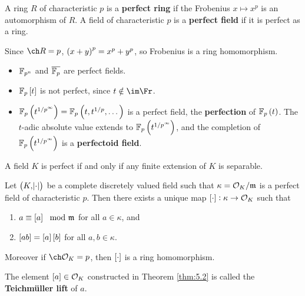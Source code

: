 \begin{definition}
A ring $ R $ of characteristic $ p $ is a \textbf{perfect ring} if the Frobenius $ x \mapsto x^p $ is an automorphism of $ R $. A field of characteristic $ p $ is a \textbf{perfect field} if it is perfect as a ring.
\end{definition}

\begin{remark*}
Since $ \ch R = p $, $ \br{x + y}^p = x^p + y^p $, so Frobenius is a ring homomorphism.
\end{remark*}

\begin{example*}
\hfill
\begin{itemize}
\item $ \mathbb{F}_{p^n} $ and $ \overline{\mathbb{F}_p} $ are perfect fields.
\item $ \FF_p\sbr{t} $ is not perfect, since $ t \notin \im \Fr $.
\item $ \FF_p\br{t^{1 / p^\infty}} = \FF_p\br{t, t^{1 / p}, \dots} $ is a perfect field, the \textbf{perfection} of $ \FF_p\br{t} $. The $ t $-adic absolute value extends to $ \FF_p\br{t^{1 / p^\infty}} $, and the completion of $ \FF_p\br{t^{1 / p^\infty}} $ is a \textbf{perfectoid field}.
\end{itemize}
\end{example*}

\begin{fact*}
A field $ K $ is perfect if and only if any finite extension of $ K $ is separable.
\end{fact*}

\pagebreak

\begin{theorem}
\label{thm:5.2}
Let $ \br{K, \abs{\cdot}} $ be a complete discretely valued field such that $ \kappa = \mathcal{O}_K / \mathfrak{m} $ is a perfect field of characteristic $ p $. Then there exists a unique map $ \sbr{\cdot} : \kappa \to \OOO_K $ such that
\begin{enumerate}
\item $ a \equiv \sbr{a} \mod \mmm $ for all $ a \in \kappa $, and
\item $ \sbr{ab} = \sbr{a}\sbr{b} $ for all $ a, b \in \kappa $.
\end{enumerate}
Moreover if $ \ch \OOO_K = p $, then $ \sbr{\cdot} $ is a ring homomorphism.
\end{theorem}

\begin{definition}
The element $ \sbr{a} \in \OOO_K $ constructed in Theorem \ref{thm:5.2} is called the \textbf{Teichm\"uller lift} of $ a $.
\end{definition}

